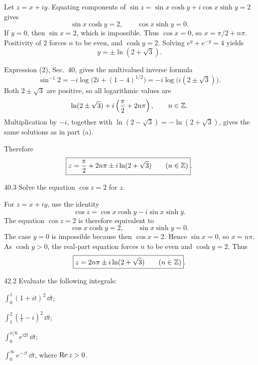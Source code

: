 \documentclass[11pt,oneside]{article}
\begin{document}
\begin{solution}
\begin{exercisesubparts}
    \item Let \(z=x+iy\). Equating components of
    \(\sin z=\sin x\cosh y+i\cos x\sinh y=2\) gives
    \[
        \sin x\cosh y=2,
        \qquad \cos x\sinh y=0.
    \]
    If \(y=0\), then \(\sin x=2\), which is impossible. Thus \(\cos x=0\), so \(x=\pi/2+n\pi\). Positivity of \(2\) forces \(n\) to be even, and \(\cosh y=2\). Solving \(e^y+e^{-y}=4\) yields
    \[
        y=\pm\ln(2+\sqrt3).
    \]
    \item Expression (2), Sec.~40, gives the multivalued inverse formula
    \[
        \sin^{-1}2=-i\log\bigl(2i+(1-4)^{1/2}\bigr)
        =-i\log\bigl(i(2\pm\sqrt3)\bigr).
    \]
    Both \(2\pm\sqrt3\) are positive, so all logarithmic values are
    \[
        \ln(2\pm\sqrt3)+i\left(\frac\pi2+2n\pi\right),
        \qquad n\in\mathbb{Z}.
    \]
    Multiplication by \(-i\), together with
    \(\ln(2-\sqrt3)=-\ln(2+\sqrt3)\), gives the same solutions as in part (a).
\end{exercisesubparts}
Therefore
\[
    \boxed{z=\frac\pi2+2n\pi\pm i\ln(2+\sqrt3)
    \qquad(n\in\mathbb{Z})}.
\]
\end{solution}

\begin{exercise}{40.3}
Solve the equation \(\cos z=2\) for \(z\).
\end{exercise}

\begin{solution}
For \(z=x+iy\), use the identity
\[
    \cos z=\cos x\cosh y-i\sin x\sinh y.
\]
The equation \(\cos z=2\) is therefore equivalent to
\[
    \cos x\cosh y=2,
    \qquad \sin x\sinh y=0.
\]
The case \(y=0\) is impossible because then \(\cos x=2\). Hence \(\sin x=0\), so \(x=n\pi\). As \(\cosh y>0\), the real-part equation forces \(n\) to be even and \(\cosh y=2\). Thus
\[
    \boxed{z=2n\pi\pm i\ln(2+\sqrt3)
    \qquad(n\in\mathbb{Z})}.
\]
\end{solution}

\begin{exercise}{42.2}
Evaluate the following integrals:
\begin{exercisesubparts}
    \item \(\displaystyle\int_0^1(1+it)^2\,\dd t\);
    \item \(\displaystyle\int_1^2\left(\frac1t-i\right)^2\,\dd t\);
    \item \(\displaystyle\int_0^{\pi/6}e^{i2t}\,\dd t\);
    \item \(\displaystyle\int_0^\infty e^{-zt}\,\dd t\), where \(\operatorname{Re} z>0\).
\end{exercisesubparts}
\end{exercise}
\end{document}
